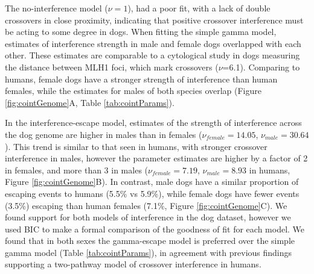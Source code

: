 The no-interference model ($\nu=1$), had a poor fit, with a lack of double crossovers in close proximity, indicating that positive crossover interference must be acting to some degree in dogs.
When fitting the simple gamma model, estimates of interference strength in male and female dogs overlapped with each other. %
These estimates are comparable to a cytological study in dogs measuring the distance between MLH1 foci, which mark crossovers ($\nu$=6.1)\cite{Basheva2008}.
Comparing to humans, female dogs have a stronger strength of interference than human females, while the estimates for males of both species overlap (Figure \ref{fig:cointGenome}A, Table \ref{tab:cointParams}).


In the interference-escape model,
estimates of the strength of interference across the dog genome are higher in males than in females ($\nu_{female}=14.05$, $\nu_{male}=30.64$).
This trend is similar to that seen in humans, with stronger crossover interference in males, however the parameter estimates are higher by a factor of 2 in females, and more than 3 in males ($\nu_{female}=7.19$, $\nu_{male}=8.93$ in humans, Figure \ref{fig:cointGenome}B).
In contrast, male dogs have a similar proportion of escaping events to humans (5.5\% vs 5.9\%), while
female dogs have fewer events (3.5\%) escaping than human females (7.1\%, Figure \ref{fig:cointGenome}C).
We found support for both models of interference in the dog dataset, however
we used BIC to make a formal comparison of the goodness of fit for each model.
We found that in both sexes the gamma-escape model is preferred over the simple gamma model (Table \ref{tab:cointParams}), in agreement with previous findings supporting a two-pathway model of crossover interference in humans\cite{Housworth2003,Campbell2015}.


